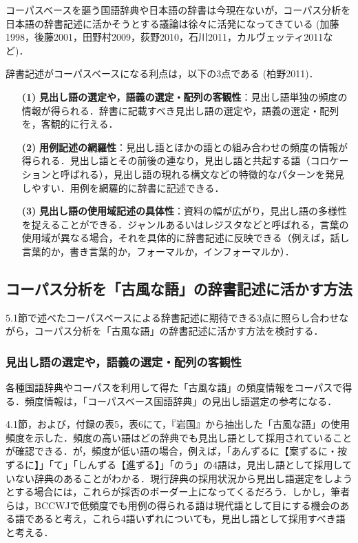 \documentclass[japanese]{jnlp_1.4}
\begin{document}
コーパスベースを謳う国語辞典や日本語の辞書は今現在ないが，コーパス分析を日本語の辞書記述に活かそうとする議論は徐々に活発になってきている (加藤1998，後藤2001，田野村2009，荻野2010，石川2011，カルヴェッティ2011など)．

辞書記述がコーパスベースになる利点は，以下の3点である (柏野2011)．

\begin{itemize}
\item[\textbf{(1)}]
\textbf{見出し語の選定や，語義の選定・配列の客観性}：見出し語単独の頻度の情報が得られる．辞書に記載すべき見出し語の選定や，語義の選定・配列を，客観的に行える．

\item[\textbf{(2)}]
\textbf{用例記述の網羅性}：見出し語とほかの語との組み合わせの頻度の情報が得られる．見出し語とその前後の連なり，見出し語と共起する語（コロケーションと呼ばれる），見出し語の現れる構文などの特徴的なパターンを発見しやすい．用例を網羅的に辞書に記述できる．

\item[\textbf{(3)}]
\textbf{見出し語の使用域記述の具体性}：資料の幅が広がり，見出し語の多様性を捉えることができる．ジャンルあるいはレジスタなどと呼ばれる，言葉の使用域が異なる場合，それを具体的に辞書記述に反映できる（例えば，話し言葉的か，書き言葉的か，フォーマルか，インフォーマルか）．
\end{itemize}


\subsection{コーパス分析を「古風な語」の辞書記述に活かす方法}

5.1節で述べたコーパスベースによる辞書記述に期待できる3点に照らし合わせながら，コーパス分析を「古風な語」の辞書記述に活かす方法を検討する．


\subsubsection{見出し語の選定や，語義の選定・配列の客観性}

各種国語辞典やコーパスを利用して得た「古風な語」の頻度情報をコーパスで得る．頻度情報は，「コーパスベース国語辞典」の見出し語選定の参考になる．

4.1節，および，付録の表5，表6にて，『岩国』から抽出した「古風な語」の使用頻度を示した．頻度の高い語はどの辞典でも見出し語として採用されていることが確認できる．が，頻度が低い語の場合，例えば，「あんずるに【案ずるに・按ずるに】」「て」「しんずる【進ずる】」「のう」の4語は，見出し語として採用していない辞典のあることがわかる．現行辞典の採用状況から見出し語選定をしようとする場合には，これらが採否のボーダー上になってくるだろう．しかし，筆者らは，BCCWJで低頻度でも用例の得られる語は現代語として目にする機会のある語であると考え，これら4語いずれについても，見出し語として採用すべき語と考える．
\end{document}
